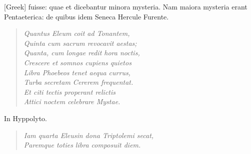  \textgreek{[Greek]}
fuisse: quae et dicebantur minora mysteria.
Nam maiora mysteria
erant Pentaeterica: de quibus idem Seneca Hercule Furente.
\begin{verse}
  \emph{Quantus Eleum coit ad Tonantem,\\
  Quinta cum sacrum revocavit aestas;\\
  Quanta, cum longae redit hora noctis,\\
  Crescere et somnos cupiens quietos\\
  Libra Phoebeos tenet aequa currus,\\
  Turba secretam Cererem frequentat.\\
  Et citi tectis properant relictis\\
  Attici noctem celebrare Mystae.}
\end{verse}

In Hyppolyto.
\begin{verse}
  \emph{Iam quarta Eleusin dona Triptolemi secat,\\
  Paremque toties libra composuit diem.}
\end{verse}

